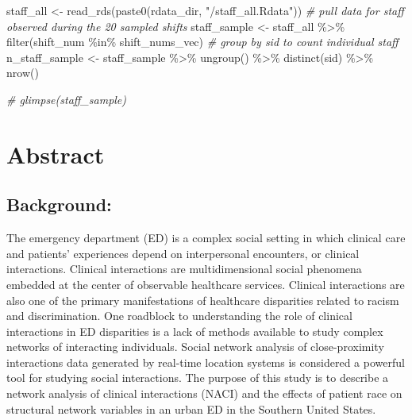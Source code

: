 \documentclass[
]{article}
\newenvironment{Shaded}{\begin{snugshade}}{\end{snugshade}}
\newcommand{\CommentTok}[1]{\textcolor[rgb]{0.56,0.35,0.01}{\textit{#1}}}
\newcommand{\FunctionTok}[1]{\textcolor[rgb]{0.00,0.00,0.00}{#1}}
\newcommand{\NormalTok}[1]{#1}
\newcommand{\OtherTok}[1]{\textcolor[rgb]{0.56,0.35,0.01}{#1}}
\newcommand{\SpecialCharTok}[1]{\textcolor[rgb]{0.00,0.00,0.00}{#1}}
\newcommand{\StringTok}[1]{\textcolor[rgb]{0.31,0.60,0.02}{#1}}
\begin{document}
\begin{Shaded}
\begin{Highlighting}[]
\NormalTok{staff\_all }\OtherTok{\textless{}{-}} \FunctionTok{read\_rds}\NormalTok{(}\FunctionTok{paste0}\NormalTok{(rdata\_dir, }\StringTok{"/staff\_all.Rdata"}\NormalTok{))}
\CommentTok{\# pull data for staff observed during the 20 sampled shifts}
\NormalTok{staff\_sample }\OtherTok{\textless{}{-}}\NormalTok{ staff\_all }\SpecialCharTok{\%\textgreater{}\%} 
  \FunctionTok{filter}\NormalTok{(shift\_num }\SpecialCharTok{\%in\%}\NormalTok{ shift\_nums\_vec)}
\CommentTok{\# group by sid to count individual staff}
\NormalTok{n\_staff\_sample }\OtherTok{\textless{}{-}}\NormalTok{ staff\_sample }\SpecialCharTok{\%\textgreater{}\%} 
  \FunctionTok{ungroup}\NormalTok{() }\SpecialCharTok{\%\textgreater{}\%} 
  \FunctionTok{distinct}\NormalTok{(sid) }\SpecialCharTok{\%\textgreater{}\%} 
  \FunctionTok{nrow}\NormalTok{()}

\CommentTok{\# glimpse(staff\_sample)}
\end{Highlighting}
\end{Shaded}

\hypertarget{abstract}{%
\section{Abstract}\label{abstract}}

\hypertarget{background}{%
\subsection{Background:}\label{background}}

The emergency department (ED) is a complex social setting in which
clinical care and patients' experiences depend on interpersonal
encounters, or clinical interactions. Clinical interactions are
multidimensional social phenomena embedded at the center of observable
healthcare services. Clinical interactions are also one of the primary
manifestations of healthcare disparities related to racism and
discrimination. One roadblock to understanding the role of clinical
interactions in ED disparities is a lack of methods available to study
complex networks of interacting individuals. Social network analysis of
close-proximity interactions data generated by real-time location
systems is considered a powerful tool for studying social interactions.
The purpose of this study is to describe a network analysis of clinical
interactions (NACI) and the effects of patient race on structural
network variables in an urban ED in the Southern United States.
\end{document}
